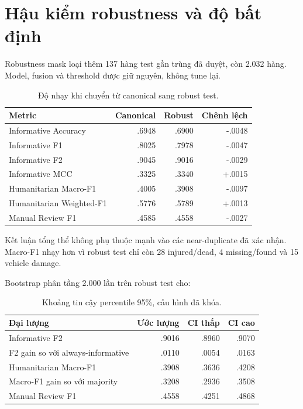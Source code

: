 \section{Hậu kiểm robustness và độ bất định}

Robustness mask loại thêm 137 hàng test gần trùng đã duyệt, còn 2.032 hàng.
Model, fusion và threshold được giữ nguyên, không tune lại.

\begin{table}[H]\centering\small
\caption{Độ nhạy khi chuyển từ canonical sang robust test.}
\begin{tabular}{lrrr}
\toprule
\textbf{Metric} & \textbf{Canonical} & \textbf{Robust} & \textbf{Chênh lệch}\\
\midrule
Informative Accuracy & .6948 & .6900 & -.0048\\
Informative F1 & .8025 & .7978 & -.0047\\
Informative F2 & .9045 & .9016 & -.0029\\
Informative MCC & .3325 & .3340 & +.0015\\
Humanitarian Macro-F1 & .4005 & .3908 & -.0097\\
Humanitarian Weighted-F1 & .5776 & .5789 & +.0013\\
Manual Review F1 & .4585 & .4558 & -.0027\\
\bottomrule
\end{tabular}
\end{table}

Kết luận tổng thể không phụ thuộc mạnh vào các near-duplicate đã xác nhận.
Macro-F1 nhạy hơn vì robust test chỉ còn 28 injured/dead, 4 missing/found và
15 vehicle damage.

Bootstrap phân tầng 2.000 lần trên robust test cho:

\begin{table}[H]\centering\small
\caption{Khoảng tin cậy percentile 95\%, cấu hình đã khóa.}
\begin{tabular}{lrrr}
\toprule
\textbf{Đại lượng} & \textbf{Ước lượng} & \textbf{CI thấp} & \textbf{CI cao}\\
\midrule
Informative F2 & .9016 & .8960 & .9070\\
F2 gain so với always-informative & .0110 & .0054 & .0163\\
Humanitarian Macro-F1 & .3908 & .3636 & .4208\\
Macro-F1 gain so với majority & .3208 & .2936 & .3508\\
Manual Review F1 & .4558 & .4251 & .4868\\
\bottomrule
\end{tabular}
\end{table}

